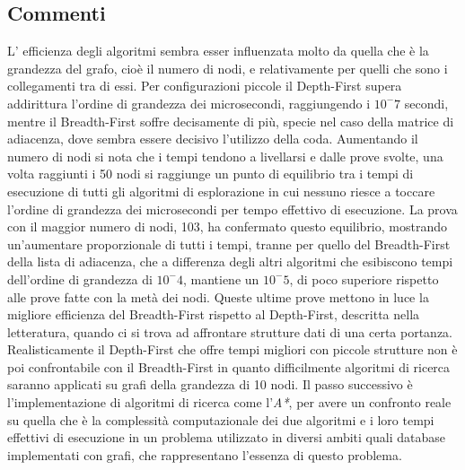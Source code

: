\documentclass{article}
\begin{document}
\subsection{Commenti}
L' efficienza degli algoritmi sembra esser influenzata molto da quella che \`e la grandezza del grafo, cio\`e il numero di nodi, e relativamente per quelli che sono i collegamenti tra di essi. \newline
Per configurazioni piccole il Depth-First supera addirittura l'ordine di grandezza dei microsecondi, raggiungendo i $10^-7$ secondi, mentre il Breadth-First soffre decisamente di pi\`u, specie nel caso della matrice di adiacenza, dove sembra essere decisivo l'utilizzo della coda.\newline
Aumentando il numero di nodi si nota che i tempi tendono a livellarsi e dalle prove svolte, una volta raggiunti i 50 nodi si raggiunge un punto di equilibrio tra i tempi di esecuzione di tutti gli algoritmi di esplorazione in cui nessuno riesce a toccare l'ordine di grandezza dei microsecondi per tempo effettivo di esecuzione. \newline
La prova con il maggior numero di nodi, 103, ha confermato questo equilibrio, mostrando un'aumentare proporzionale di tutti i tempi, tranne per quello del Breadth-First della lista di adiacenza, che a differenza degli altri algoritmi che esibiscono tempi dell'ordine di grandezza di $10^-4$, mantiene un $10^-5$, di poco superiore rispetto alle prove fatte con la met\`a dei nodi.\newline
Queste ultime prove mettono in luce la migliore efficienza del Breadth-First rispetto al Depth-First, descritta nella letteratura, quando ci si trova ad affrontare strutture dati di una certa portanza. \newline
Realisticamente il Depth-First che offre tempi migliori con piccole strutture non \`e poi confrontabile con il Breadth-First in quanto difficilmente algoritmi di ricerca saranno applicati su grafi della grandezza di 10 nodi.\newline
Il passo successivo \`e l'implementazione di algoritmi di ricerca come l'\textit{A*}, per avere un confronto reale su quella che \`e la complessit\`a computazionale dei due algoritmi e i loro tempi effettivi di esecuzione in un problema utilizzato in diversi ambiti quali database implementati con grafi, che rappresentano l'essenza di questo problema.
\end{document}
